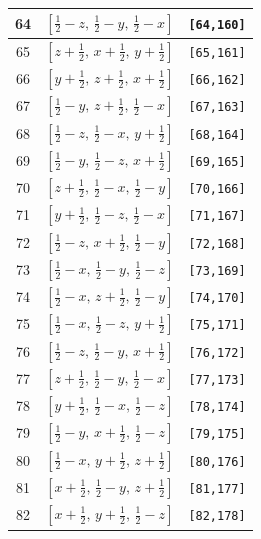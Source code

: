 \documentclass[fleqn,8pt]{jsarticle}
\begin{document}
\begin{longtable}{ccc}
64 & $\left[ \frac{1}{2} - z,\, \frac{1}{2} - y,\, \frac{1}{2} - x \right]$ & {\tt [64,160]} \\ \hline
65 & $\left[ z + \frac{1}{2},\, x + \frac{1}{2},\, y + \frac{1}{2} \right]$ & {\tt [65,161]} \\ \hline
66 & $\left[ y + \frac{1}{2},\, z + \frac{1}{2},\, x + \frac{1}{2} \right]$ & {\tt [66,162]} \\ \hline
67 & $\left[ \frac{1}{2} - y,\, z + \frac{1}{2},\, \frac{1}{2} - x \right]$ & {\tt [67,163]} \\ \hline
68 & $\left[ \frac{1}{2} - z,\, \frac{1}{2} - x,\, y + \frac{1}{2} \right]$ & {\tt [68,164]} \\ \hline
69 & $\left[ \frac{1}{2} - y,\, \frac{1}{2} - z,\, x + \frac{1}{2} \right]$ & {\tt [69,165]} \\ \hline
70 & $\left[ z + \frac{1}{2},\, \frac{1}{2} - x,\, \frac{1}{2} - y \right]$ & {\tt [70,166]} \\ \hline
71 & $\left[ y + \frac{1}{2},\, \frac{1}{2} - z,\, \frac{1}{2} - x \right]$ & {\tt [71,167]} \\ \hline
72 & $\left[ \frac{1}{2} - z,\, x + \frac{1}{2},\, \frac{1}{2} - y \right]$ & {\tt [72,168]} \\ \hline
73 & $\left[ \frac{1}{2} - x,\, \frac{1}{2} - y,\, \frac{1}{2} - z \right]$ & {\tt [73,169]} \\ \hline
74 & $\left[ \frac{1}{2} - x,\, z + \frac{1}{2},\, \frac{1}{2} - y \right]$ & {\tt [74,170]} \\ \hline
75 & $\left[ \frac{1}{2} - x,\, \frac{1}{2} - z,\, y + \frac{1}{2} \right]$ & {\tt [75,171]} \\ \hline
76 & $\left[ \frac{1}{2} - z,\, \frac{1}{2} - y,\, x + \frac{1}{2} \right]$ & {\tt [76,172]} \\ \hline
77 & $\left[ z + \frac{1}{2},\, \frac{1}{2} - y,\, \frac{1}{2} - x \right]$ & {\tt [77,173]} \\ \hline
78 & $\left[ y + \frac{1}{2},\, \frac{1}{2} - x,\, \frac{1}{2} - z \right]$ & {\tt [78,174]} \\ \hline
79 & $\left[ \frac{1}{2} - y,\, x + \frac{1}{2},\, \frac{1}{2} - z \right]$ & {\tt [79,175]} \\ \hline
80 & $\left[ \frac{1}{2} - x,\, y + \frac{1}{2},\, z + \frac{1}{2} \right]$ & {\tt [80,176]} \\ \hline
81 & $\left[ x + \frac{1}{2},\, \frac{1}{2} - y,\, z + \frac{1}{2} \right]$ & {\tt [81,177]} \\ \hline
82 & $\left[ x + \frac{1}{2},\, y + \frac{1}{2},\, \frac{1}{2} - z \right]$ & {\tt [82,178]} \\ \hline

\end{longtable}
\end{document}

